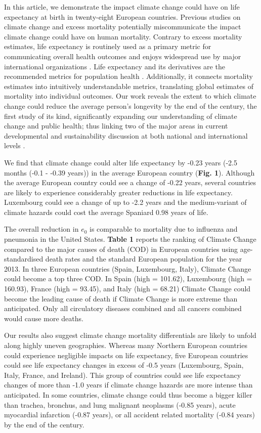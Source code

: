 \documentclass[12pt,]{article}
\begin{document}
In this article, we demonstrate the impact climate change could have on
life expectancy at birth in twenty-eight European countries. Previous
studies on climate change and excess mortality potentially
miscommunicate the impact climate change could have on human mortality.
Contrary to excess mortality estimates, life expectancy is routinely
used as a primary metric for communicating overall health outcomes and
enjoys widespread use by major international organizations
\citep{world2015world, marmot2012building, salomon2012healthy}. Life
expectancy and its derivatives are the recommended metrics for
population health \citep{parrish2010peer}. Additionally, it connects
mortality estimates into intuitively understandable metrics, translating
global estimates of mortality into individual outcomes. Our work reveals
the extent to which climate change could reduce the average person's
longevity by the end of the century, the first study of its kind,
significantly expanding our understanding of climate change and public
health; thus linking two of the major areas in current developmental and
sustainability discussion at both national and international levels
\citep{abel2016meeting}.

We find that climate change could alter life expectancy by -0.23 years
(-2.5 months (-0.1 - -0.39 years)) in the average European country
(\textbf{Fig. 1}). Although the average European country could see a
change of -0.22 years, several countries are likely to experience
considerably greater reductions in life expectancy. Luxembourg could see
a change of up to -2.2 years and the medium-variant of climate hazards
could cost the average Spaniard 0.98 years of life.

The overall reduction in \(e_0\) is comparable to mortality due to
influenza and pneumonia \citep{arias2013united} in the United States.
\textbf{Table 1} reports the ranking of Climate Change compared to the
major causes of death (COD) in European countries using age-standardised
death rates and the standard European population
\citep{pace2013revision} for the year 2013. In three European countries
(Spain, Luxembourg, Italy), Climate Change could become a top three COD.
In Spain (high = 101.62), Luxembourg (high = 160.93), France (high =
93.45), and Italy (high = 68.21) Climate Change could become the leading
cause of death if Climate Change is more extreme than anticipated. Only
all circulatory diseases combined and all cancers combined would cause
more deaths.

Our results also suggest climate change mortality differentials are
likely to unfold along highly uneven geographies. Whereas many Northern
European countries could experience negligible impacts on life
expectancy, five European countries could see life expectancy changes in
excess of -0.5 years (Luxembourg, Spain, Italy, France, and Ireland).
This group of countries could see life expectancy changes of more than
-1.0 years if climate change hazards are more intense than anticipated.
In some countries, climate change could thus become a bigger killer than
trachea, bronchus, and lung malignant neoplasms (-0.85 years), acute
myocardial infarction (-0.87 years), or all accident related mortality
(-0.84 years) \citep{arias2013united} by the end of the century.
\end{document}
